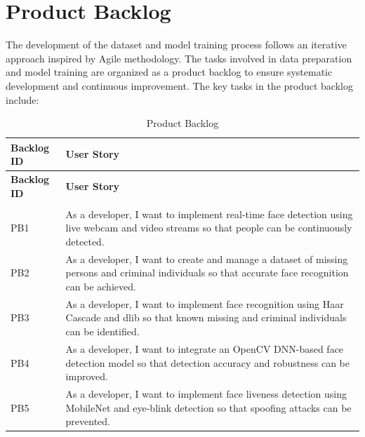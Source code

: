 \documentclass[11pt]{report}
\begin{document}
\section{Product Backlog}
The development of the dataset and model training process follows an iterative approach inspired
by Agile methodology. The tasks involved in data preparation and model training are organized as
a product backlog to ensure systematic development and continuous improvement.
The key tasks in the product backlog include:
\renewcommand{\arraystretch}{1.5}
\begin{longtable}{| l | p{} |}

\hline
\textbf{Backlog ID} & \textbf{User Story} \\ \hline
\endfirsthead

\hline
\textbf{Backlog ID} & \textbf{User Story} \\ \hline
\endhead

\hline 
\endfoot

\hline
\caption{Product Backlog} \label{tab:product_backlog} \\
\endlastfoot

PB1 & As a developer, I want to implement real-time face detection using live webcam and video streams so that people can be continuously detected. \\ \hline

PB2 & As a developer, I want to create and manage a dataset of missing persons and criminal individuals so that accurate face recognition can be achieved. \\ \hline

PB3 & As a developer, I want to implement face recognition using Haar Cascade and dlib so that known missing and criminal individuals can be identified. \\ \hline

PB4 & As a developer, I want to integrate an OpenCV DNN-based face detection model so that detection accuracy and robustness can be improved. \\ \hline

PB5 & As a developer, I want to implement face liveness detection using MobileNet and eye-blink detection so that spoofing attacks can be prevented. \\ \hline


\end{longtable}
\end{document}
